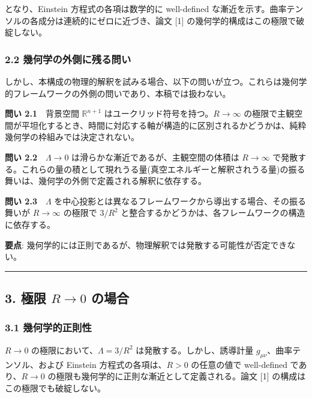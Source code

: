 \documentclass[a4paper,11pt]{ltjsarticle}
\theoremstyle{definition}
\begin{document}
となり、Einstein 方程式の各項は数学的に well-defined な漸近を示す。曲率テンソルの各成分は連続的にゼロに近づき、論文 {[}1{]} の幾何学的構成はこの極限で破綻しない。

\subsubsection{2.2 幾何学の外側に残る問い}\label{ux5e7eux4f55ux5b66ux306eux5916ux5074ux306bux6b8bux308bux554fux3044}

しかし、本構成の物理的解釈を試みる場合、以下の問いが立つ。これらは幾何学的フレームワークの外側の問いであり、本稿では扱わない。

\textbf{問い 2.1}　背景空間 \(\mathbb{R}^{n+1}\) はユークリッド符号を持つ。\(R \to \infty\) の極限で主観空間が平坦化するとき、時間に対応する軸が構造的に区別されるかどうかは、純粋幾何学の枠組みでは決定されない。

\textbf{問い 2.2}　\(\Lambda \to 0\) は滑らかな漸近であるが、主観空間の体積は \(R \to \infty\) で発散する。これらの量の積として現れうる量(真空エネルギーと解釈されうる量)の振る舞いは、幾何学の外側で定義される解釈に依存する。

\textbf{問い 2.3}　\(\Lambda\) を中心投影とは異なるフレームワークから導出する場合、その振る舞いが \(R \to \infty\) の極限で \(3/R^2\) と整合するかどうかは、各フレームワークの構造に依存する。

\textbf{要点}: 幾何学的には正則であるが、物理解釈では発散する可能性が否定できない。

\begin{center}\rule{0.5\linewidth}{0.5pt}\end{center}

\subsection{\texorpdfstring{3. 極限 \(R \to 0\) の場合}{3. 極限 R \textbackslash to 0 の場合}}\label{ux6975ux9650-r-to-0-ux306eux5834ux5408}

\subsubsection{3.1 幾何学的正則性}\label{ux5e7eux4f55ux5b66ux7684ux6b63ux5247ux6027-1}

\(R \to 0\) の極限において、\(\Lambda = 3/R^2\) は発散する。しかし、誘導計量 \(g_{\mu\nu}\)、曲率テンソル、および Einstein 方程式の各項は、\(R > 0\) の任意の値で well-defined であり、\(R \to 0\) の極限も幾何学的に正則な漸近として定義される。論文 {[}1{]} の構成はこの極限でも破綻しない。
\end{document}
